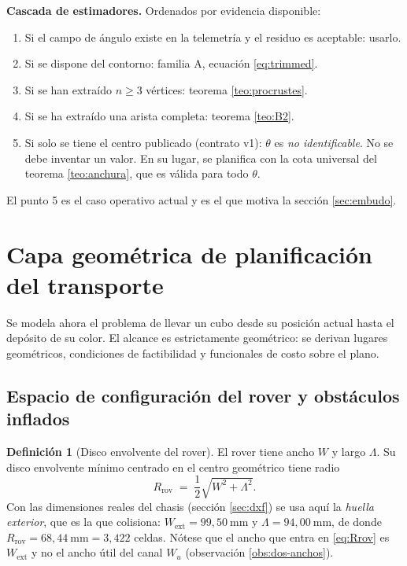 \documentclass[11pt,a4paper]{article}
\theoremstyle{definition}
\newtheorem{definicion}[teorema]{Definición}
\begin{document}
\begin{resultado}
\textbf{Cascada de estimadores.} Ordenados por evidencia disponible:
\begin{enumerate}[label=\arabic*.,leftmargin=2.4em,itemsep=2pt]
\item Si el campo de ángulo existe en la telemetría y el residuo es aceptable: usarlo.
\item Si se dispone del contorno: familia A, ecuación \eqref{eq:trimmed}.
\item Si se han extraído $n\ge 3$ vértices: teorema \ref{teo:procrustes}.
\item Si se ha extraído una arista completa: teorema \ref{teo:B2}.
\item Si solo se tiene el centro publicado (contrato v1): $\theta$ es \emph{no
      identificable}. No se debe inventar un valor. En su lugar, se planifica con la
      cota universal del teorema \ref{teo:anchura}, que es válida para todo $\theta$.
\end{enumerate}
El punto 5 es el caso operativo actual y es el que motiva la sección \ref{sec:embudo}.
\end{resultado}

\section{Capa geométrica de planificación del transporte}
\label{sec:planificacion}

Se modela ahora el problema de llevar un cubo desde su posición actual hasta el
depósito de su color. El alcance es estrictamente geométrico: se derivan lugares
geométricos, condiciones de factibilidad y funcionales de costo sobre el plano.

\subsection{Espacio de configuración del rover y obstáculos inflados}

\begin{definicion}[Disco envolvente del rover]
El rover tiene ancho $W$ y largo $\Lambda$. Su disco envolvente mínimo centrado en el
centro geométrico tiene radio
\begin{equation}
  R_{\mathrm{rov}} \;=\; \frac{1}{2}\sqrt{W^2 + \Lambda^2}.
  \label{eq:Rrov}
\end{equation}
Con las dimensiones reales del chasis (sección \ref{sec:dxf}) se usa aquí la
\emph{huella exterior}, que es la que colisiona:
$W_{\mathrm{ext}} = 99{,}50\ \mathrm{mm}$ y $\Lambda = 94{,}00\ \mathrm{mm}$, de donde
$R_{\mathrm{rov}} = 68{,}44\ \mathrm{mm} = 3{,}422$ celdas. Nótese que el ancho que entra
en \eqref{eq:Rrov} es $W_{\mathrm{ext}}$ y no el ancho útil del canal $W_u$
(observación \ref{obs:dos-anchos}).
\end{definicion}
\end{document}
